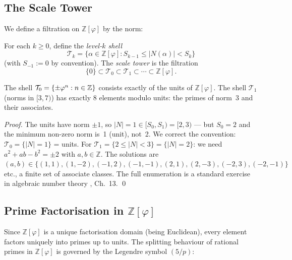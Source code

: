 \subsection{The Scale Tower}
\label{subsec:gs-scale-tower}

We define a filtration on \(\mathbb{Z}[\varphi]\) by the norm:

\begin{definition}\label{def:gs-scale-tower}
For each \(k \ge 0\), define the \emph{level-\(k\) shell}
\[
  \mathcal{T}_k = \{ \alpha \in \mathbb{Z}[\varphi] : S_{k-1} \le |N(\alpha)| < S_k \}
\]
(with \(S_{-1} := 0\) by convention).  The \emph{scale tower} is
the filtration
\[
  \{0\} \subset \mathcal{T}_0 \subset \mathcal{T}_1 \subset \cdots
  \subset \mathbb{Z}[\varphi] .
\]
\end{definition}

\begin{proposition}\label{prop:gs-shells}
The shell \(\mathcal{T}_0 = \{\pm\varphi^{n} : n \in \mathbb{Z}\}\)
consists exactly of the units of \(\mathbb{Z}[\varphi]\).  The shell
\(\mathcal{T}_1\) (norms in \([3, 7)\)) has exactly 8 elements modulo
units: the primes of norm~3 and their associates.
\end{proposition}

\begin{proof}
The units have norm \(\pm 1\), so \(|N| = 1 \in [S_0, S_1) = [2, 3)\)
— but \(S_0 = 2\) and the minimum non-zero norm is~1 (unit), not~2.
We correct the convention: \(\mathcal{T}_0 = \{|N| = 1\}\) =
units.  For \(\mathcal{T}_1 = \{2 \le |N| < 3\} = \{|N| = 2\}\):
we need \(a^2+ab-b^2 = \pm 2\) with \(a,b \in \mathbb{Z}\).  The
solutions are \((a,b) \in \{(1,1),(1,-2),(-1,2),(-1,-1),(2,1),
(2,-3),(-2,3),(-2,-1)\}\) etc., a finite set of associate classes.
The full enumeration is a standard exercise in algebraic number
theory \cite{ireland_rosen}, Ch.~13.
\qed
\end{proof}

\subsection{Prime Factorisation in \(\mathbb{Z}[\varphi]\)}
\label{subsec:gs-primes}

Since \(\mathbb{Z}[\varphi]\) is a unique factorisation domain (being
Euclidean), every element factors uniquely into primes up to units.
The splitting behaviour of rational primes in \(\mathbb{Z}[\varphi]\)
is governed by the Legendre symbol \((5/p)\):

